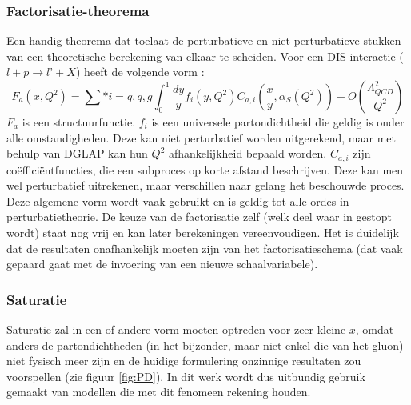 \documentclass[a4paper,11pt]{article}
\numberwithin{equation}{section} %
\begin{document}
    \subsubsection{Factorisatie-theorema}
Een handig theorema dat toelaat de perturbatieve en niet-perturbatieve stukken van een  theoretische berekening van elkaar te scheiden.
Voor een DIS interactie ($l+p\rightarrow l’+X$) heeft de volgende vorm \cite{Martin}: 
\begin{equation}
F_a(x, Q^2) = \sum*{i=q,q,g} \int_0^1 \frac{dy}{y} f_i(y, Q^2) C_{a,i} \left( \frac{x}{y},\alpha_S(Q^2) \right) + O \left( \frac{\Lambda_{QCD}^2}{Q^2} \right) 
\end{equation}
$F_a$ is een structuurfunctie.
$f_i$ is een universele partondichtheid die geldig is onder alle omstandigheden.
Deze kan niet perturbatief worden uitgerekend, maar met behulp van DGLAP kan hun $Q^2$ afhankelijkheid bepaald worden.
$C_{a,i}$ zijn coëfficiëntfuncties, die een subproces op korte afstand beschrijven.
Deze kan men wel perturbatief uitrekenen, maar verschillen naar gelang het beschouwde proces.
Deze algemene vorm wordt vaak gebruikt en is geldig tot alle ordes in perturbatietheorie.
De keuze van de factorisatie zelf (welk deel waar in gestopt wordt) staat nog vrij en kan later berekeningen vereenvoudigen.
Het is duidelijk dat de resultaten onafhankelijk moeten zijn van het factorisatieschema (dat vaak gepaard gaat met de invoering van een nieuwe schaalvariabele).

    \subsubsection{Saturatie} \label{sec:Saturatie}
Saturatie zal in een of andere vorm moeten optreden voor zeer kleine $x$, omdat anders de partondichtheden (in het bijzonder, maar niet enkel die van het gluon) niet fysisch meer zijn en de huidige formulering onzinnige resultaten zou voorspellen (zie figuur \ref{fig:PD}).
In dit werk wordt dus uitbundig gebruik gemaakt van modellen die met dit fenomeen rekening houden.
\end{document}
